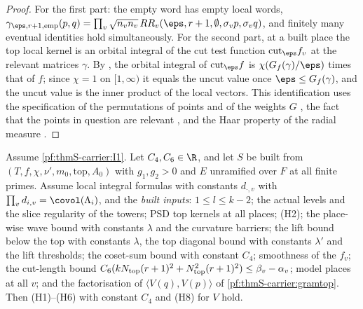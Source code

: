 \begin{proof}
For the first part: the empty word has empty local words, $\gamma_{\eps,r+1,\mathrm{emp}}(p,q)=\prod_v\sqrt{n_vn_v}\,
RR_v(\eps,r+1,\emptyset,\sigma_vp,\sigma_vq)$, and finitely many eventual identities hold simultaneously. For the second
part, at a built place the top local kernel is an orbital integral of the cut test function $\mathrm{cut}_\eps f_v$ at the
relevant matrices $\gamma$. By , the orbital integral of
$\mathrm{cut}_\eps f$ is $\chi(G_f(\gamma)/\eps)$ times that of $f$; since $\chi=1$ on $[1,\infty)$ it equals the uncut value
once $\eps\le G_f(\gamma)$, and the uncut value is the inner product of the local vectors. This identification uses the
specification of the permutations of points  and of the weights $G$
, the fact that the points in question are relevant
, and the Haar property of the radial measure
.
\end{proof}

\begin{proposition}\label{pf:thmS-carrier:parts-built}
Assume \ref{pf:thmS-carrier:I1}. Let $C_4,C_6\in\R$, and let $S$ be built from $(T,f,\chi,\nu',m_0,\mathrm{top},A_0)$ with
$g_1,g_2>0$ and $E$ unramified over $F$ at all finite primes. Assume local integral formulas with constants $d_{\cdot,v}$
with $\prod_vd_{i,v}=\covol(\Lambda_i)$, and the \emph{built inputs}: $1\le l\le k-2$; the actual levels and the slice
regularity of the towers; PSD top kernels at all places; (H2); the place-wise wave bound with constants $\lambda$ and the
curvature barriers; the lift bound below the top with constants $\lambda$, the top diagonal bound with constants
$\lambda'$ and the lift thresholds; the coset-sum bound with constant $C_4$; smoothness of the $f_v$; the cut-length bound
$C_6(kN_{\mathrm{top}}(r+1)^2+N_{\mathrm{top}}^2(r+1)^2)\le\beta_v-\alpha_v$; model places at all $v$; and the
factorisation of $\langle V(q),V(p)\rangle$ of \cref{pf:thmS-carrier:gramtop}. Then (H1)--(H6) with constant $C_4$ and (H8)
for $V$ hold.
\end{proposition}

